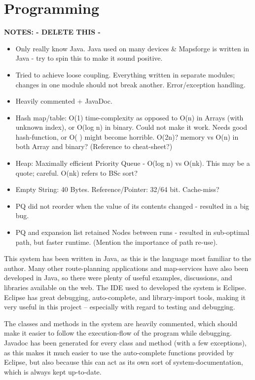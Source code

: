 \section{Programming}
\textbf{NOTES: - DELETE THIS -}
\begin{itemize}
	\item Only really know Java. Java used on many devices \& Mapsforge is written in Java - try to spin this to make it sound positive.
	\item Tried to achieve loose coupling. Everything written in separate modules; changes in one module should not break another. Error/exception handling.
	\item Heavily commented + JavaDoc.
	\item Hash map/table: O(1) time-complexity as opposed to O(n) in Arrays (with unknown index), or O(log n) in binary. Could not make it work. Needs good hash-function, or O( ) might become horrible. O(2n)? memory vs O(n) in both Array and binary? (Reference to cheat-sheet?)
	\item Heap: Maximally efficient Priority Queue - O(log n) vs O(nk). This may be a quote; careful. O(nk) refers to BSc sort?
	\item Empty String: 40 Bytes. Reference/Pointer: 32/64 bit. Cache-miss?
	\item PQ did not reorder when the value of its contents changed - resulted in a big bug.
	\item PQ and expansion list retained Nodes between runs - resulted in sub-optimal path, but faster runtime. (Mention the importance of path re-use).
\end{itemize}

This system has been written in Java, as this is the language most familiar to the author. Many other route-planning applications and map-services have also been developed in Java, so there were plenty of useful examples, discussions, and libraries available on the web.
The IDE used to developed the system is Eclipse\cite{Eclipse_License}. Eclipse has great debugging, auto-complete, and library-import tools, making it very useful in this project -- especially with regard to testing and debugging.

The classes and methods in the system are heavily commented, which should make it easier to follow the execution-flow of the program while debugging. Javadoc has been generated for every class and method (with a few exceptions), as this makes it much easier to use the auto-complete functions provided by Eclipse, but also because this can act as its own sort of system-documentation, which is always kept up-to-date.

